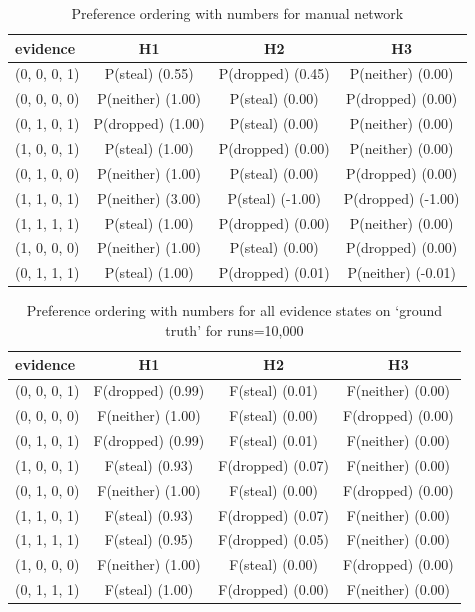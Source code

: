 \documentclass[12pt]{article}
\begin{document}
\begin{table}
\centering
\small
\begin{tabular}{|l|c|c|c|}
\hline
evidence & H1 & H2 & H3 \\
\hline
(0, 0, 0, 1)&P(steal) (0.55) & P(dropped) (0.45) & P(neither) (0.00) \\
(0, 0, 0, 0)&P(neither) (1.00) & P(steal) (0.00) & P(dropped) (0.00) \\
(0, 1, 0, 1)&P(dropped) (1.00) & P(steal) (0.00) & P(neither) (0.00) \\
(1, 0, 0, 1)&P(steal) (1.00) & P(dropped) (0.00) & P(neither) (0.00) \\
(0, 1, 0, 0)&P(neither) (1.00) & P(steal) (0.00) & P(dropped) (0.00) \\
(1, 1, 0, 1)&P(neither) (3.00) & P(steal) (-1.00) & P(dropped) (-1.00) \\
(1, 1, 1, 1)&P(steal) (1.00) & P(dropped) (0.00) & P(neither) (0.00) \\
(1, 0, 0, 0)&P(neither) (1.00) & P(steal) (0.00) & P(dropped) (0.00) \\
(0, 1, 1, 1)&P(steal) (1.00) & P(dropped) (0.01) & P(neither) (-0.01) \\
\hline
\end{tabular}
\caption{ Preference ordering with numbers for manual network}
\label{ wife}
\end{table}%
\begin{table}
\centering
\small
\begin{tabular}{|l|c|c|c|}
\hline
evidence & H1 & H2 & H3 \\
\hline
(0, 0, 0, 1)&F(dropped) (0.99) & F(steal) (0.01) & F(neither) (0.00) \\
(0, 0, 0, 0)&F(neither) (1.00) & F(steal) (0.00) & F(dropped) (0.00) \\
(0, 1, 0, 1)&F(dropped) (0.99) & F(steal) (0.01) & F(neither) (0.00) \\
(1, 0, 0, 1)&F(steal) (0.93) & F(dropped) (0.07) & F(neither) (0.00) \\
(0, 1, 0, 0)&F(neither) (1.00) & F(steal) (0.00) & F(dropped) (0.00) \\
(1, 1, 0, 1)&F(steal) (0.93) & F(dropped) (0.07) & F(neither) (0.00) \\
(1, 1, 1, 1)&F(steal) (0.95) & F(dropped) (0.05) & F(neither) (0.00) \\
(1, 0, 0, 0)&F(neither) (1.00) & F(steal) (0.00) & F(dropped) (0.00) \\
(0, 1, 1, 1)&F(steal) (1.00) & F(dropped) (0.00) & F(neither) (0.00) \\
\hline
\end{tabular}
\caption{ Preference ordering with numbers for all evidence states on `ground truth' for runs=10,000}
\label{heretic}
\end{table}
\end{document}
